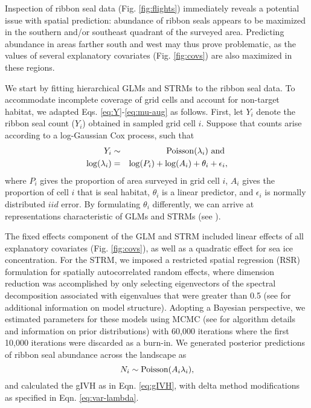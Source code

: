 \documentclass[10pt,letterpaper]{article}
\begin{document}
Inspection of ribbon seal data (Fig. \ref{fig:flights}) immediately reveals a potential
issue with spatial prediction: abundance of ribbon seals appears to be maximized in the southern and/or southeast quadrant of the surveyed area.  Predicting abundance in areas farther south and west may thus prove problematic, as the values of several explanatory covariates (Fig. \ref{fig:covs}) are also maximized in these regions.

We start by fitting hierarchical GLMs and STRMs to the ribbon seal data.  To accommodate incomplete coverage of grid cells and account for non-target habitat, we adapted Eqs. \ref{eq:Y}-\ref{eq:mu-aug} as follows.
First, let $Y_i$ denote the ribbon seal count ($Y_i$) obtained in sampled grid cell $i$.  Suppose that counts arise according to a log-Gaussian Cox process, such that
\begin{eqnarray}
  \label{eqn:Cox}
  Y_i & \sim & {\rm Poisson}(\lambda_i) \mbox{ and } \\
  \log(\lambda_i) & = & \log(P_i) + \log(A_i) + \theta_i + \epsilon_i, \nonumber
\end{eqnarray}
where $P_i$ gives the proportion of area surveyed in grid cell $i$, $A_i$ gives the proportion of cell $i$ that is seal habitat, $\theta_i$ is a linear predictor, and $\epsilon_i$ is normally distributed $iid$ error.  By formulating $\theta_i$ differently, we can arrive at representations characteristic of GLMs and STRMs (see ).

The fixed effects component of the GLM and STRM included linear effects of all explanatory covariates (Fig. \ref{fig:covs}), as well as a quadratic effect for sea ice concentration.  For the STRM, we imposed a restricted spatial regression (RSR) formulation for spatially autocorrelated random effects, where dimension reduction was accomplished by only selecting eigenvectors of the spectral decomposition associated with eigenvalues that were greater than 0.5 (see  for additional information on model structure).  Adopting a Bayesian perspective, we estimated parameters for these models using MCMC (see  for algorithm details and information on prior distributions) with 60,000 iterations where the first 10,000 iterations were discarded as a burn-in.  We generated posterior predictions of ribbon seal abundance across the landscape as
\begin{equation}
  N_i \sim {\rm Poisson}(A_i \lambda_i),
\end{equation}
and calculated the gIVH as in Eqn. \ref{eq:gIVH}, with delta method modifications as specified in Eqn. \ref{eq:var-lambda}.
\end{document}
